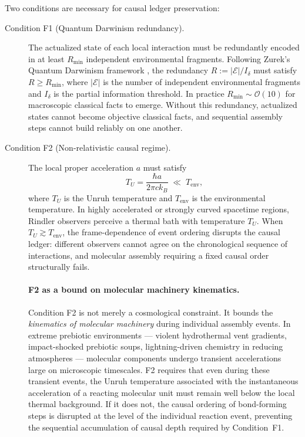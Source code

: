 \documentclass[11pt,a4paper]{article}
\theoremstyle{plain}
\theoremstyle{definition}
\theoremstyle{remark}
\begin{document}
Two conditions are necessary for causal ledger preservation:

\begin{description}
  \item[Condition F1 (Quantum Darwinism redundancy).]
  The actualized state of each local interaction must be redundantly encoded
  in at least $R_{\min}$ independent environmental fragments. Following
  Zurek's Quantum Darwinism framework \citep{Zurek2009}, the redundancy
  $R := |\mathcal{E}|/I_\delta$ must satisfy $R \geq R_{\min}$, where
  $|\mathcal{E}|$ is the number of independent environmental fragments and
  $I_\delta$ is the partial information threshold. In practice
  $R_{\min} \sim \mathcal{O}(10)$ for macroscopic classical facts to emerge.
  Without this redundancy, actualized states cannot become objective classical
  facts, and sequential assembly steps cannot build reliably on one another.

  \item[Condition F2 (Non-relativistic causal regime).]
  The local proper acceleration $a$ must satisfy
  \begin{equation}
    T_U = \frac{\hbar a}{2\pi c k_B} \;\ll\; T_{\mathrm{env}},
    \label{eq:unruh}
  \end{equation}
  where $T_U$ is the Unruh temperature \citep{Unruh1976} and $T_{\mathrm{env}}$
  is the environmental temperature. In highly accelerated or strongly curved
  spacetime regions, Rindler observers perceive a thermal bath with temperature
  $T_U$. When $T_U \gtrsim T_{\mathrm{env}}$, the frame-dependence of event
  ordering disrupts the causal ledger: different observers cannot agree on the
  chronological sequence of interactions, and molecular assembly requiring a
  fixed causal order structurally fails.

  \paragraph{F2 as a bound on molecular machinery kinematics.}
  Condition F2 is not merely a cosmological constraint.  It bounds the
  \emph{kinematics of molecular machinery} during individual assembly events.
  In extreme prebiotic environments --- violent hydrothermal vent gradients,
  impact-shocked prebiotic soups, lightning-driven chemistry in reducing
  atmospheres --- molecular components undergo transient accelerations
  large on microscopic timescales.  F2 requires that even during these
  transient events, the Unruh temperature associated with the instantaneous
  acceleration of a reacting molecular unit must remain well below the local
  thermal background.  If it does not, the causal ordering of bond-forming steps
  is disrupted at the level of the individual reaction event, preventing the
  sequential accumulation of causal depth required by Condition~F1.


\end{description}
\end{document}
